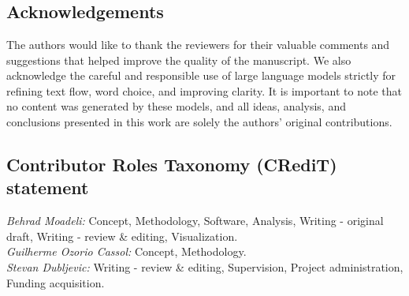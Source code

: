 \section*{} 
\newpage
\subsection*{Acknowledgements}
\label{sec:ack}

The authors would like to thank the reviewers for their valuable comments and suggestions that helped improve the quality of the manuscript. We also acknowledge the careful and responsible use of large language models strictly for refining text flow, word choice, and improving clarity. It is important to note that no content was generated by these models, and all ideas, analysis, and conclusions presented in this work are solely the authors’ original contributions.

\subsection*{Contributor Roles Taxonomy (CRediT) statement}

\textit{Behrad Moadeli:} Concept, Methodology, Software, Analysis, Writing - original draft, Writing - review \& editing, Visualization.\\
\textit{Guilherme Ozorio Cassol:} Concept, Methodology.\\
\textit{Stevan Dubljevic:} Writing - review \& editing, Supervision, Project administration, Funding acquisition.